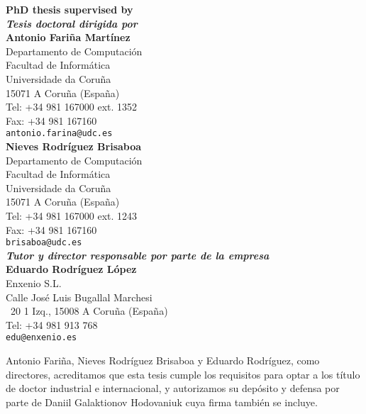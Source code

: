 \thispagestyle{empty}

\begin{flushleft}

{\bfseries PhD thesis supervised by} \\[1pt]
{\itshape \bfseries Tesis doctoral dirigida por} \\[4mm]

{\bfseries Antonio Fari\~na Mart\'inez} \\[2pt]
Departamento de Computaci\'on \\[1pt]
Facultad de Inform\'atica \\[1pt]
Universidade da Coru\~na \\[1pt]
15071 A Coru\~na (Espa\~na) \\[1pt]
Tel: +34 981 167000 ext. 1352 \\[1pt]
Fax: +34 981 167160 \\[1pt]
\verb=antonio.farina@udc.es= \\[4mm]

{\bfseries Nieves Rodr\'iguez Brisaboa} \\[2pt]
Departamento de Computaci\'on \\[1pt]
Facultad de Inform\'atica \\[1pt]
Universidade da Coru\~na \\[1pt]
15071 A Coru\~na (Espa\~na) \\[1pt]
Tel: +34 981 167000 ext. 1243 \\[1pt]
Fax: +34 981 167160 \\[1pt]
\verb=brisaboa@udc.es= \\[8mm]

{\itshape \bfseries Tutor y director responsable por parte de la empresa} \\[4mm]

{\bfseries Eduardo Rodr\'iguez L\'opez} \\[2pt]
Enxenio S.L. \\[1pt]
Calle Jos\'e Luis Bugallal Marchesi \\[1pt]
\textnumero~20 1 Izq., 15008 A Coru\~na (Espa\~na) \\[1pt]
Tel: +34 981 913 768 \\[1pt]
\verb=edu@enxenio.es=

\end{flushleft}

Antonio Fari\~na, Nieves Rodr\'iguez Brisaboa y Eduardo Rodr\'iguez, como directores, acreditamos que esta tesis cumple los requisitos para optar a los t\'itulo de doctor industrial e internacional, y autorizamos su dep\'osito y defensa por parte de Daniil Galaktionov Hodovaniuk cuya firma tambi\'en se incluye.



